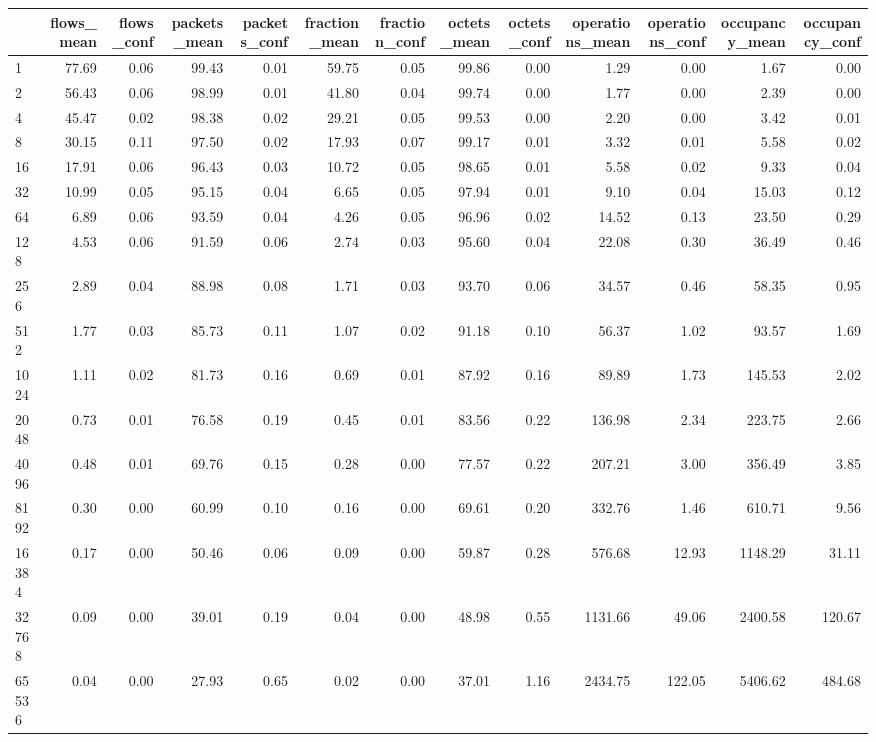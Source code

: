 \begin{tabular}{lrrrrrrrrrrrr}
\toprule
 & flows_mean & flows_conf & packets_mean & packets_conf & fraction_mean & fraction_conf & octets_mean & octets_conf & operations_mean & operations_conf & occupancy_mean & occupancy_conf \\
\midrule
1 & 77.69 & 0.06 & 99.43 & 0.01 & 59.75 & 0.05 & 99.86 & 0.00 & 1.29 & 0.00 & 1.67 & 0.00 \\
2 & 56.43 & 0.06 & 98.99 & 0.01 & 41.80 & 0.04 & 99.74 & 0.00 & 1.77 & 0.00 & 2.39 & 0.00 \\
4 & 45.47 & 0.02 & 98.38 & 0.02 & 29.21 & 0.05 & 99.53 & 0.00 & 2.20 & 0.00 & 3.42 & 0.01 \\
8 & 30.15 & 0.11 & 97.50 & 0.02 & 17.93 & 0.07 & 99.17 & 0.01 & 3.32 & 0.01 & 5.58 & 0.02 \\
16 & 17.91 & 0.06 & 96.43 & 0.03 & 10.72 & 0.05 & 98.65 & 0.01 & 5.58 & 0.02 & 9.33 & 0.04 \\
32 & 10.99 & 0.05 & 95.15 & 0.04 & 6.65 & 0.05 & 97.94 & 0.01 & 9.10 & 0.04 & 15.03 & 0.12 \\
64 & 6.89 & 0.06 & 93.59 & 0.04 & 4.26 & 0.05 & 96.96 & 0.02 & 14.52 & 0.13 & 23.50 & 0.29 \\
128 & 4.53 & 0.06 & 91.59 & 0.06 & 2.74 & 0.03 & 95.60 & 0.04 & 22.08 & 0.30 & 36.49 & 0.46 \\
256 & 2.89 & 0.04 & 88.98 & 0.08 & 1.71 & 0.03 & 93.70 & 0.06 & 34.57 & 0.46 & 58.35 & 0.95 \\
512 & 1.77 & 0.03 & 85.73 & 0.11 & 1.07 & 0.02 & 91.18 & 0.10 & 56.37 & 1.02 & 93.57 & 1.69 \\
1024 & 1.11 & 0.02 & 81.73 & 0.16 & 0.69 & 0.01 & 87.92 & 0.16 & 89.89 & 1.73 & 145.53 & 2.02 \\
2048 & 0.73 & 0.01 & 76.58 & 0.19 & 0.45 & 0.01 & 83.56 & 0.22 & 136.98 & 2.34 & 223.75 & 2.66 \\
4096 & 0.48 & 0.01 & 69.76 & 0.15 & 0.28 & 0.00 & 77.57 & 0.22 & 207.21 & 3.00 & 356.49 & 3.85 \\
8192 & 0.30 & 0.00 & 60.99 & 0.10 & 0.16 & 0.00 & 69.61 & 0.20 & 332.76 & 1.46 & 610.71 & 9.56 \\
16384 & 0.17 & 0.00 & 50.46 & 0.06 & 0.09 & 0.00 & 59.87 & 0.28 & 576.68 & 12.93 & 1148.29 & 31.11 \\
32768 & 0.09 & 0.00 & 39.01 & 0.19 & 0.04 & 0.00 & 48.98 & 0.55 & 1131.66 & 49.06 & 2400.58 & 120.67 \\
65536 & 0.04 & 0.00 & 27.93 & 0.65 & 0.02 & 0.00 & 37.01 & 1.16 & 2434.75 & 122.05 & 5406.62 & 484.68 \\

\end{tabular}

